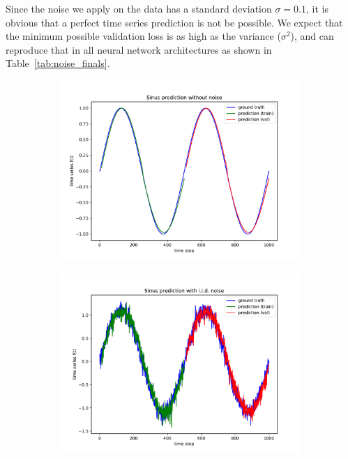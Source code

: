 \documentclass{article}
\begin{document}
Since the noise we apply on the data has a standard deviation $\sigma = 0.1$,
it is obvious that a perfect time series prediction is not be possible. We 
expect that the minimum possible validation loss is as high as the variance 
($\sigma^2$), and can reproduce that in all neural network architectures as
shown in Table~\ref{tab:noise_finals}.
  
\begin{figure}
  \begin{subfigure}{.35\textwidth}
    \centering
    \includegraphics[width=\linewidth]{figures/plot_twolayer_noiseless.pdf}
  \end{subfigure} 
  \hspace{-5mm}
  \begin{subfigure}{.35\textwidth}
    \centering
    \includegraphics[width=\linewidth]{figures/plot_twolayer_iidnoise.pdf}

\end{subfigure}
\end{figure}
\end{document}
